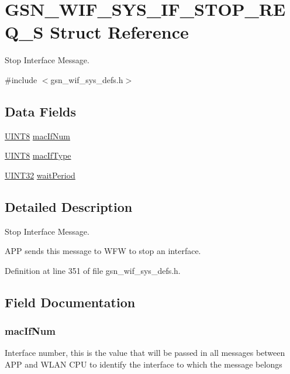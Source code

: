 \hypertarget{a00355}{
\section{GSN\_\-WIF\_\-SYS\_\-IF\_\-STOP\_\-REQ\_\-S Struct Reference}
\label{a00355}
}


Stop Interface Message.  




{\ttfamily \#include $<$gsn\_\-wif\_\-sys\_\-defs.h$>$}

\subsection*{Data Fields}
\begin{DoxyCompactItemize}
\item 
\hyperlink{a00660_gab27e9918b538ce9d8ca692479b375b6a}{UINT8} \hyperlink{a00355_ae57ae92e651751e7978e237c55133b4c}{macIfNum}
\item 
\hyperlink{a00660_gab27e9918b538ce9d8ca692479b375b6a}{UINT8} \hyperlink{a00355_ae22f1eeffa8ecf759f18f577db286c8d}{macIfType}
\item 
\hyperlink{a00660_gae1e6edbbc26d6fbc71a90190d0266018}{UINT32} \hyperlink{a00355_a8bca99e0f7f7ec2ddca909f71f121850}{waitPeriod}
\end{DoxyCompactItemize}


\subsection{Detailed Description}
Stop Interface Message. 

APP sends this message to WFW to stop an interface. 

Definition at line 351 of file gsn\_\-wif\_\-sys\_\-defs.h.



\subsection{Field Documentation}
\hypertarget{a00355_ae57ae92e651751e7978e237c55133b4c}{
\subsubsection[{macIfNum}]{ {\bf macIfNum}}}
\label{a00355_ae57ae92e651751e7978e237c55133b4c}
Interface number, this is the value that will be passed in all messages between APP and WLAN CPU to identify the interface to which the message belongs 

